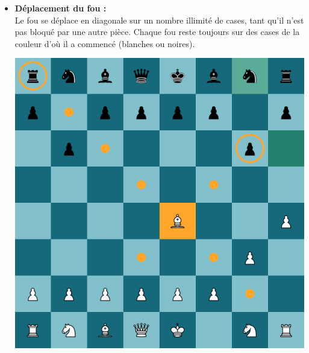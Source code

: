 \documentclass{article}
\begin{document}
\begin{itemize}
    \item \begin{minipage}{0.45\textwidth}
        \textbf{Déplacement du fou :} \\
        Le fou se déplace en diagonale sur un nombre illimité de cases, tant qu'il n'est pas bloqué par une autre pièce.
         Chaque fou reste toujours sur des cases de la couleur d'où il a commencé (blanches ou noires).
    \end{minipage}
    \hspace{0.05\textwidth}
    \begin{minipage}{0.45\textwidth}
        \centering
        \includegraphics[width=\textwidth]{fouMove.png}
    \end{minipage}

    \vspace{0.5cm}


\end{itemize}
\end{document}
